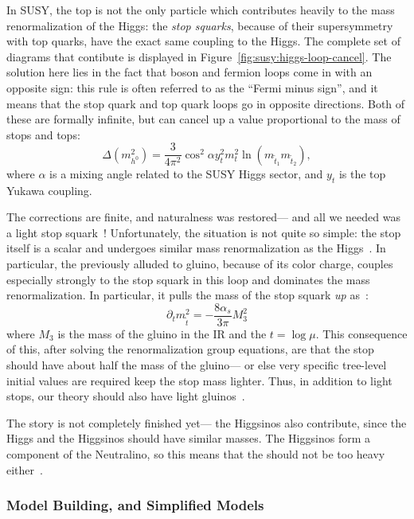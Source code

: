 In SUSY, the top is not the only particle which contributes heavily to the mass renormalization of the Higgs: the \textit{stop squarks}, because of their supersymmetry with top quarks, have the exact same coupling to the Higgs. The complete set of diagrams that contibute is displayed in Figure~\ref{fig:susy:higgs-loop-cancel}. The solution here lies in the fact that boson and fermion loops come in with an opposite sign: this rule is often referred to as the ``Fermi minus sign'', and it means that the stop quark and top quark loops go in opposite directions. Both of these are formally infinite, but can cancel up a value proportional to the mass of stops and tops: \cite{Martin1997}
%
\begin{equation}
\Delta(m_{h^0}^2) = \frac{3}{4\pi^2} \cos^2 \alpha y_t^2 m_t^2 \ln \left( m_{\tilde{t}_1} m_{\tilde{t}_2} \right),
\end{equation}
%
where $\alpha$ is a mixing angle related to the SUSY Higgs sector, and $y_t$ is the top Yukawa coupling.

The corrections are finite, and naturalness was restored--- and all we needed was a light stop squark~\cite{Dimopoulos:1981zb,Witten:1981nf,Dine:1981za,Dimopoulos:1981au,Sakai:1981gr,Kaul:1981hi}! Unfortunately, the situation is not quite so simple: the stop itself is a scalar and undergoes similar mass renormalization as the Higgs~\cite{natural}. In particular, the previously alluded to gluino, because of its color charge, couples especially strongly to the stop squark in this loop and dominates the mass renormalization. In particular, it pulls the mass of the stop squark \textit{up} as~\cite{natural}:
%
\begin{equation}
\partial_t m_{\tilde{t}}^2 = - \frac{8\alpha_s}{3\pi} M_3^2
\end{equation}
%
where $M_3$ is the mass of the gluino in the IR and the $t = \log \mu$. This consequence of this, after solving the renormalization group equations, are that the stop should have about half the mass of the gluino--- or else very specific tree-level initial values are required keep the stop mass lighter. Thus, in addition to light stops, our theory should also have light gluinos~\cite{natural}.

The story is not completely finished yet--- the Higgsinos also contribute, since the Higgs and the Higgsinos should have similar masses. The Higgsinos form a component of the Neutralino, so this means that the \lsp should not be too heavy either~\cite{natural}.


\subsubsection{Model Building, and Simplified Models}

